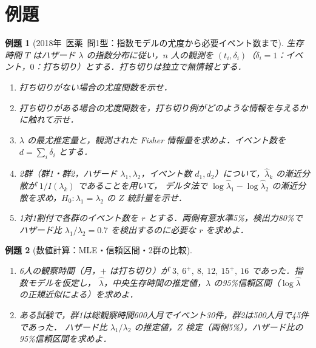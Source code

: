 \documentclass[a4paper,11pt,openany]{ltjsbook}
\newtheorem{reidai}{例題}[chapter]
\newcommand{\kakomon}[2]{\mbox{#1年 医薬 問#2}}
\begin{document}
\section{例題}\label{sec:m01-reidai}
\begin{reidai}[\kakomon{2018}{1}型：指数モデルの尤度から必要イベント数まで]\label{reidai:m01-1}
生存時間 $T$ はハザード $\lambda$ の指数分布に従い，$n$ 人の観測を $(t_i,\delta_i)$（$\delta_i=1$：イベント，$0$：打ち切り）とする．打ち切りは独立で無情報とする．
\begin{enumerate}[label=〔\arabic*〕]
\item 打ち切りがない場合の尤度関数を示せ．
\item 打ち切りがある場合の尤度関数を，打ち切り例がどのような情報を与えるかに触れて示せ．
\item $\lambda$ の最尤推定量と，観測された Fisher 情報量を求めよ．イベント数を $d=\sum_i\delta_i$ とする．
\item 2群（群1・群2，ハザード $\lambda_1,\lambda_2$，イベント数 $d_1,d_2$）について，$\hat\lambda_k$ の漸近分散が $1/I(\lambda_k)$ であることを用いて，
      デルタ法で $\log\hat\lambda_1-\log\hat\lambda_2$ の漸近分散を求め，$H_0:\lambda_1=\lambda_2$ の $Z$ 統計量を示せ．
\item 1対1割付で各群のイベント数を $r$ とする．両側有意水準5\%，検出力80\%でハザード比 $\lambda_1/\lambda_2=0.7$ を検出するのに必要な $r$ を求めよ．
\end{enumerate}
\end{reidai}

\begin{reidai}[数値計算：MLE・信頼区間・2群の比較]\label{reidai:m01-2}
\begin{enumerate}[label=〔\arabic*〕]
\item 6人の観察時間（月，$+$ は打ち切り）が $3,\ 6^+,\ 8,\ 12,\ 15^+,\ 16$ であった．指数モデルを仮定し，
      $\hat\lambda$，中央生存時間の推定値，$\lambda$ の95\%信頼区間（$\log\hat\lambda$ の正規近似による）を求めよ．
\item ある試験で，群1は総観察時間600人月でイベント30件，群2は500人月で45件であった．
      ハザード比 $\lambda_1/\lambda_2$ の推定値，$Z$ 検定（両側5\%），ハザード比の95\%信頼区間を求めよ．
\end{enumerate}
\end{reidai}

\end{document}
